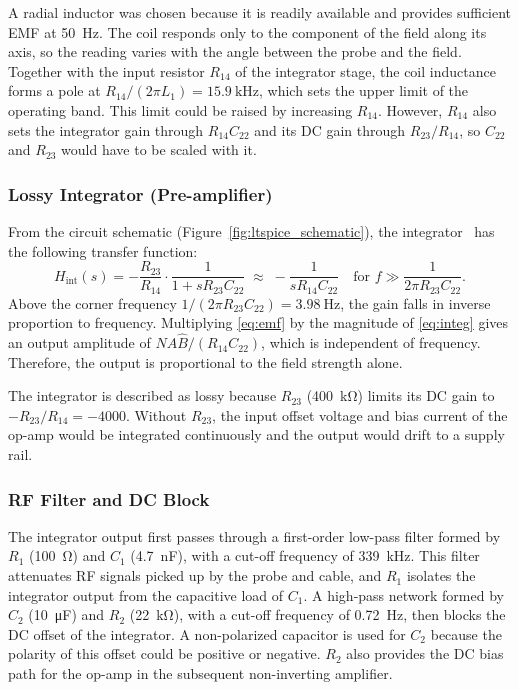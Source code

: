 \documentclass[11pt,a4paper]{article}
\begin{document}
A radial inductor was chosen because it is readily available and provides sufficient EMF at \SI{50}{\hertz}. The coil responds only to the component of the field along its axis, so the reading varies with the angle between the probe and the field. Together with the input resistor $R_{14}$ of the integrator stage, the coil inductance forms a pole at $R_{14}/(2\pi L_1) = \SI{15.9}{\kilo\hertz}$, which sets the upper limit of the operating band. This limit could be raised by increasing $R_{14}$. However, $R_{14}$ also sets the integrator gain through $R_{14}C_{22}$ and its DC gain through $R_{23}/R_{14}$, so $C_{22}$ and $R_{23}$ would have to be scaled with it.

\subsubsection{Lossy Integrator (Pre-amplifier)}
From the circuit schematic (Figure~\ref{fig:ltspice_schematic}), the integrator~\cite{horowitz2015} has the following transfer function:
\begin{equation}
  H_{\mathrm{int}}(s) = -\frac{R_{23}}{R_{14}}\cdot\frac{1}{1 + sR_{23}C_{22}}
  \;\approx\; -\frac{1}{sR_{14}C_{22}} \quad \text{for } f \gg \frac{1}{2\pi R_{23}C_{22}}.
  \label{eq:integ}
\end{equation}
Above the corner frequency $1/(2\pi R_{23}C_{22}) = \SI{3.98}{\hertz}$, the gain falls in inverse proportion to frequency. Multiplying \eqref{eq:emf} by the magnitude of \eqref{eq:integ} gives an output amplitude of $N A \hat B/(R_{14}C_{22})$, which is independent of frequency. Therefore, the output is proportional to the field strength alone.

The integrator is described as lossy because $R_{23}$ (\SI{400}{\kilo\ohm}) limits its DC gain to $-R_{23}/R_{14} = -4000$. Without $R_{23}$, the input offset voltage and bias current of the op-amp would be integrated continuously and the output would drift to a supply rail.

\subsubsection{RF Filter and DC Block}
The integrator output first passes through a first-order low-pass filter formed by $R_1$ (\SI{100}{\ohm}) and $C_1$ (\SI{4.7}{\nano\farad}), with a cut-off frequency of \SI{339}{\kilo\hertz}. This filter attenuates RF signals picked up by the probe and cable, and $R_1$ isolates the integrator output from the capacitive load of $C_1$. A high-pass network formed by $C_2$ (\SI{10}{\micro\farad}) and $R_2$ (\SI{22}{\kilo\ohm}), with a cut-off frequency of \SI{0.72}{\hertz}, then blocks the DC offset of the integrator. A non-polarized capacitor is used for $C_2$ because the polarity of this offset could be positive or negative. $R_2$ also provides the DC bias path for the op-amp in the subsequent non-inverting amplifier.
\end{document}
